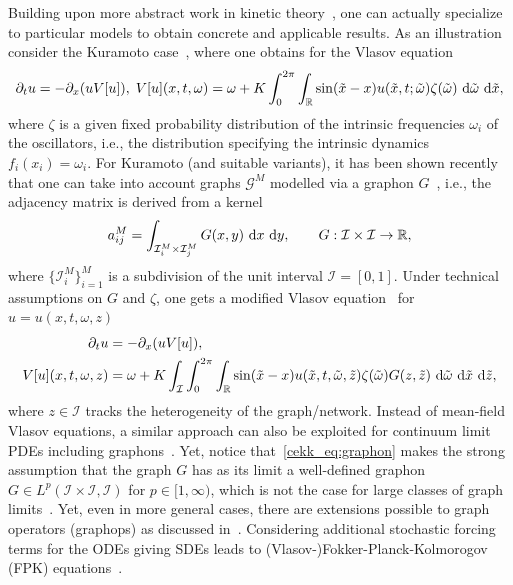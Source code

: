 \documentclass[10pt]{article}
\begin{document}
Building upon more abstract work in kinetic theory~\cite{Neunzert,Golse,Jabin}, one can actually specialize to particular models to obtain concrete and applicable results. As an illustration consider the Kuramoto case~\cite{Lancellotti}, where one obtains for the Vlasov equation
\begin{equation*}
	\label{cekk_eq:KurVlas}
	\partial_t u = - \partial_x(uV[u]),\; V[u](x,t,\omega)=\omega + K \int_0^{2\pi}\int_\mathbb{R} \sin(\tilde{x}-x) u(\tilde{x},t;\tilde{\omega})\zeta(\tilde{\omega})~\textnormal{d} \tilde{\omega} ~\textnormal{d} \tilde{x},
\end{equation*}
where $\zeta$ is a given fixed probability distribution of the intrinsic frequencies $\omega_i$ of the oscillators, i.e., the distribution specifying the intrinsic dynamics $f_i(x_i)=\omega_i$. For Kuramoto (and suitable variants), it has been shown recently that one can take into account graphs $\mathcal{G}^M$ modelled via a graphon $G$~\cite{Lovasz}, i.e., the adjacency matrix is derived from a kernel 
\begin{equation}
	\label{cekk_eq:graphon}
	a^M_{ij}=\int_{\mathcal{I}_i^M\times \mathcal{I}_j^M} G(x,y)~\textnormal{d} x~\textnormal{d} y,\qquad G:\mathcal{I}\times \mathcal{I}\rightarrow \mathbb{R},
\end{equation} 
where $\{\mathcal{I}_i^M\}_{i=1}^M$ is a subdivision of the unit interval $\mathcal{I}=[0,1]$. Under technical assumptions on $G$ and $\zeta$, one gets a modified Vlasov equation~\cite{AyiDuteil,ChibaMedvedev,KaliuzhnyiVerbovetskyiMedvedev1} for $u=u(x,t,\omega,z)$
\begin{equation*}
	\label{cekk_eq:KurVlas1}
	\begin{split}
		\partial_t u &= - \partial_x(uV[u]), \\
		V[u](x,t,\omega,z) &=\omega + K \int_\mathcal{I}\int_0^{2\pi}\int_\mathbb{R}  \sin(\tilde{x}-x) u(\tilde{x},t,\tilde{\omega},\tilde{z})\zeta(\tilde{\omega})G(z,\tilde{z})~\textnormal{d} \tilde{\omega}~\textnormal{d} \tilde{x}~\textnormal{d} \tilde{z},
	\end{split}
\end{equation*}
where $z\in \mathcal{I}$ tracks the heterogeneity of the graph/network. Instead of mean-field Vlasov equations, a similar approach can also be exploited for continuum limit PDEs including graphons~\cite{Medvedev3,Medvedev2,KaliuzhnyiVerbovetskyiMedvedev,KuehnThrom2}. Yet, notice that~\eqref{cekk_eq:graphon} makes the strong assumption that the graph $G$ has as its limit a well-defined graphon $G\in L^p(\mathcal{I}\times \mathcal{I},\mathcal{I})$ for $p\in[1,\infty)$, which is not the case for large classes of graph limits~\cite{BackhauszSzegedy}. Yet, even in more general cases, there are extensions possible to graph operators (graphops) as discussed in~\cite{KuehnGraphops,GkogkasKuehn,KuehnXu,GkogkasKuehnXu,GkogkasKuehnXu1}. Considering additional stochastic forcing terms for the ODEs giving SDEs leads to (Vlasov-)Fokker-Planck-Kolmorogov (FPK) equations~\cite{Risken,Frank,Pavliotis1,Sznitman}. 
\end{document}
